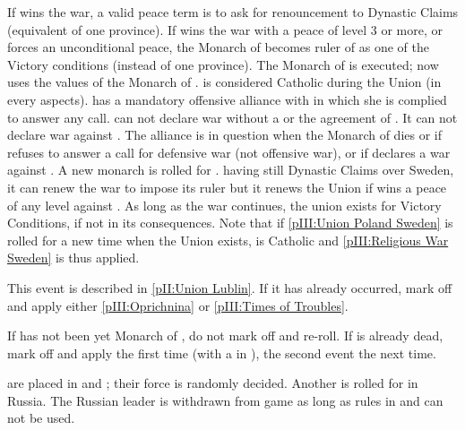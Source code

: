 \phpaix
\aparag If \SUE wins the war, a valid peace term is to ask for renouncement to
Dynastic Claims (equivalent of one province).
\aparag If \POL wins the war with a peace of level 3 or more, or forces an
unconditional peace, the Monarch of \POL becomes ruler of \SUE as one of the
Victory conditions (instead of one province).
\bparag The Monarch of \SUE is executed; now \SUE uses the values of the
Monarch of \POL. \SUE is considered Catholic during the Union (in every
aspects).
\bparag \SUE has a mandatory offensive alliance with \POL in which she is
complied to answer any call.
\bparag \SUE can not declare war without a \CB or the agreement of \POL.  It
can not declare war against \POL.
\bparag The alliance is in question when the Monarch of \POL dies or if \POL
refuses to answer a call for defensive war (not offensive war), or if \POL
declares a war against \SUE.  A new monarch is rolled for \SUE. \POL having
still Dynastic Claims over Sweden, it can renew the war to impose its ruler
but it renews the Union if \POL wins a peace of any level against \SUE. As
long as the war continues, the union exists for Victory Conditions, if not in
its consequences.
\bparag Note that if \ref{pIII:Union Poland Sweden} is rolled for a new time
when the Union exists, \SUE is Catholic and \ref{pIII:Religious War Sweden} is
thus applied.





\condition{}
\aparag This event is described in \ref{pII:Union Lublin}.
\aparag If it has already occurred, mark off and apply either
\ref{pIII:Oprichnina} or \ref{pIII:Times of Troubles}.





\condition{}
\aparag If  has not been yet Monarch of \RUS, do not mark
off and re-roll.
\aparag If  is already dead, mark off and apply \RD the
first time (with a \REVOLT in \RUS), the second event the next time.

\phevnt
\aparag \REVOLT are placed in \provinceMoscou and \provinceNovgorod; their
force is randomly decided.
\aparag Another \REVOLT is rolled for in Russia.
\aparag The Russian leader \leaderKurbsky is withdrawn from game as long as
 rules in \RUS and can not be used.

